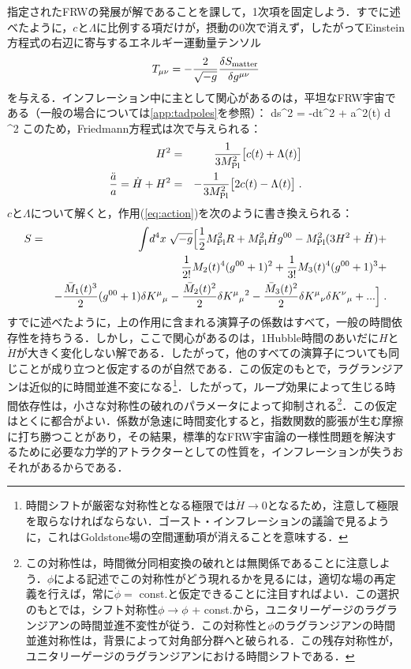 指定されたFRWの発展が解であることを課して，1次項を固定しよう．すでに述べたように，$c$と$\Lambda$に比例する項だけが，摂動の0次で消えず，したがってEinstein方程式の右辺に寄与するエネルギー運動量テンソル
\begin{equation}
T_{\mu \nu} = -\frac{2}{\sqrt{-g}}\frac{\delta S_{\rm
matter}}{\delta g^{\mu\nu}}
\end{equation}
を与える．インフレーション中に主として関心があるのは，平坦なFRW宇宙である（一般の場合については\ref{app:tadpoles}を参照）：
\be
ds^2 = -dt^2 + a^2(t) d ^2 
\ee
このため，Friedmann方程式は次で与えられる：
\begin{eqnarray}
H^2 & = & \frac{1}{3 M_{\rm Pl}^2} \big[ c(t)+\Lambda(t)\big]  \\
\frac{\ddot a}{a} = \dot H + H^2 & =  & -\frac{1}{3 M_{\rm Pl}^2} \big[ 2
c(t)-\Lambda(t) \big] \;.
\end{eqnarray}
$c$と$\Lambda$について解くと，作用(\ref{eq:action})を次のように書き換えられる：
\begin{eqnarray}
\label{eq:actiontad}
S &=& \int  \! d^4 x \; \sqrt{- g} \Big[ \frac12 M_{\rm Pl}^2 R + M_{\rm Pl}^2 \dot H
g^{00} - M_{\rm Pl}^2 (3 H^2 + \dot H) +  \nonumber \\ && \frac{1}{2!}M_2(t)^4(g^{00}+1)^2+\frac{1}{3!}M_3(t)^4 (g^{00}+1)^3+ \nonumber \\
&& - \frac{\bar M_1(t)^3}{2} (g^{00}+1)\delta K^\mu {}_\mu
-\frac{\bar M_2(t)^2}{2} \delta K^\mu {}_\mu {}^2
-\frac{\bar M_3(t)^2}{2} \delta K^\mu {}_\nu \delta K^\nu {}_\mu + ...
\Big] \; .
\end{eqnarray}
すでに述べたように，上の作用に含まれる演算子の係数はすべて，一般の時間依存性を持ちうる．しかし，ここで関心があるのは，1Hubble時間のあいだに$H$と$\dot H$が大きく変化しない解である．したがって，他のすべての演算子についても同じことが成り立つと仮定するのが自然である．この仮定のもとで，ラグランジアンは近似的に時間並進不変になる\footnote{時間シフトが厳密な対称性となる極限では$\dot H \to 0$となるため，注意して極限を取らなければならない．ゴースト・インフレーションの議論で見るように，これはGoldstone場の空間運動項が消えることを意味する．}．したがって，ループ効果によって生じる時間依存性は，小さな対称性の破れのパラメータによって抑制される\footnote{この対称性は，時間微分同相変換の破れとは無関係であることに注意しよう．$\phi$による記述でこの対称性がどう現れるかを見るには，適切な場の再定義を行えば，常に$\dot\phi =$ const.と仮定できることに注目すればよい．この選択のもとでは，シフト対称性$\phi \to \phi $ + const.から，ユニタリーゲージのラグランジアンの時間並進不変性が従う．この対称性と$\phi$のラグランジアンの時間並進対称性は，背景によって対角部分群へと破られる．この残存対称性が，ユニタリーゲージのラグランジアンにおける時間シフトである．}．この仮定はとくに都合がよい．係数が急速に時間変化すると，指数関数的膨張が生む摩擦に打ち勝つことがあり，その結果，標準的なFRW宇宙論の一様性問題を解決するために必要な力学的アトラクターとしての性質を，インフレーションが失うおそれがあるからである．


